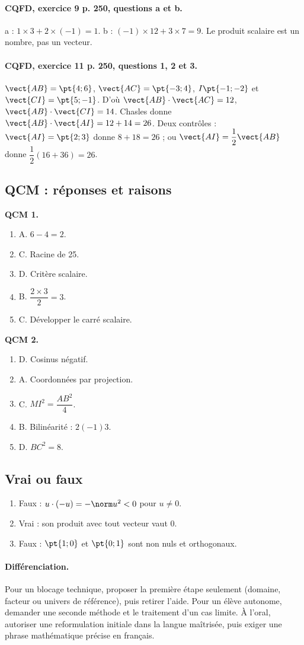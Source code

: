 \paragraph{CQFD, exercice 9 p. 250, questions a et b.} a : $1\times3+2\times(-1)=1$. b : $(-1)\times12+3\times7=9$. Le produit scalaire est un nombre, pas un vecteur.
\paragraph{CQFD, exercice 11 p. 250, questions 1, 2 et 3.} $\vect{AB}=\pt{4;6}$, $\vect{AC}=\pt{-3;4}$, $I\pt{-1;-2}$ et $\vect{CI}=\pt{5;-1}$. D’où $\vect{AB}\cdot\vect{AC}=12$, $\vect{AB}\cdot\vect{CI}=14$. Chasles donne $\vect{AB}\cdot\vect{AI}=12+14=26$. Deux contrôles : $\vect{AI}=\pt{2;3}$ donne $8+18=26$ ; ou $\vect{AI}=\dfrac12\vect{AB}$ donne $\dfrac12(16+36)=26$.
\subsection*{QCM : réponses et raisons}
\textbf{QCM 1.}
\begin{enumerate}
\item A. $6-4=2$.
\item C. Racine de 25.
\item D. Critère scalaire.
\item B. $\dfrac{2\times 3}{2}=3$.
\item C. Développer le carré scalaire.
\end{enumerate}
\textbf{QCM 2.}
\begin{enumerate}
\item D. Cosinus négatif.
\item A. Coordonnées par projection.
\item C. $MI^2=\dfrac{AB^2}{4}$.
\item B. Bilinéarité : $2(-1)3$.
\item D. $BC^2=8$.
\end{enumerate}
\subsection*{Vrai ou faux}
\begin{enumerate}
\item Faux : $u\cdot(-u)=-\norm u^2<0$ pour $u\ne0$.
\item Vrai : son produit avec tout vecteur vaut 0.
\item Faux : $\pt{1;0}$ et $\pt{0;1}$ sont non nuls et orthogonaux.
\end{enumerate}
\paragraph{Différenciation.} Pour un blocage technique, proposer la première étape seulement (domaine, facteur ou univers de référence), puis retirer l’aide. Pour un élève autonome, demander une seconde méthode et le traitement d’un cas limite. À l’oral, autoriser une reformulation initiale dans la langue maîtrisée, puis exiger une phrase mathématique précise en français.
